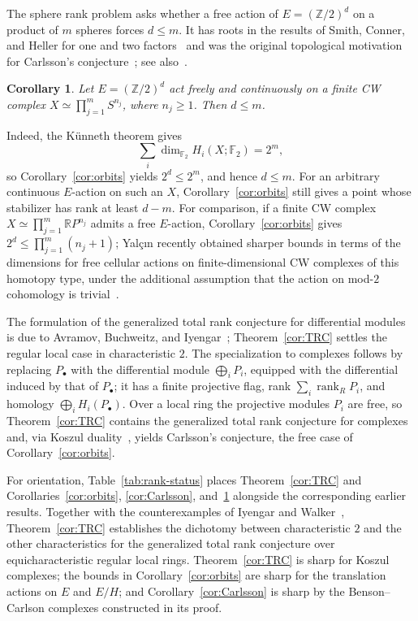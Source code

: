 \documentclass[11pt,reqno]{amsart}
\theoremstyle{plain}
\newtheorem{corintro}[thmintro]{Corollary}
\theoremstyle{definition}
\DeclareMathOperator{\rank}{rank}
\newcommand{\Ff}{\mathbb{F}}
\newcommand{\Z}{\mathbb{Z}}
\begin{document}
The sphere rank problem asks whether a free action of $E=(\Z/2)^d$ on a product of $m$ spheres
forces $d\le m$.  It has roots in the results of Smith, Conner, and Heller for one and two
factors~\cite{Smith,Conner,Heller} and was the original topological motivation for Carlsson's
conjecture~\cite{CarlssonSpheres,CarlssonSphereRank}; see
also~\cite{AdemBrowder,Hanke,OkutanYalcin}.
\begin{corintro}\label{cor:sphere-rank}
Let $E=(\Z/2)^d$ act freely and continuously on a finite CW complex
$X\simeq\prod_{j=1}^m S^{n_j}$, where $n_j\ge1$.  Then $d\le m$.
\end{corintro}

Indeed, the K\"unneth theorem gives
\[
 \sum_i\dim_{\Ff_2}H_i(X;\Ff_2)=2^m,
\]
so Corollary~\ref{cor:orbits} yields $2^d\le2^m$, and hence $d\le m$.  For an arbitrary continuous $E$-action
on such an $X$, Corollary~\ref{cor:orbits} still gives a point whose stabilizer has rank at least
$d-m$.  For comparison, if a finite CW complex
$X\simeq\prod_{j=1}^m\mathbb{R}P^{n_j}$ admits a free $E$-action, Corollary~\ref{cor:orbits} gives
$2^d\le\prod_{j=1}^m(n_j+1)$; Yal\c{c}{\i}n recently obtained sharper bounds in terms of the dimensions for
free cellular actions on finite-dimensional CW complexes of this homotopy type, under the additional
assumption that the action on mod-$2$ cohomology is trivial~\cite[Theorem~2]{YalcinRP}.

The formulation of the generalized total rank conjecture for differential modules is due to
Avramov, Buchweitz, and Iyengar~\cite[Conjecture~5.3]{ABI}; Theorem~\ref{cor:TRC} settles the regular local case in
characteristic $2$.  The specialization to complexes follows by replacing $P_\bullet$ with the
differential module $\bigoplus_iP_i$, equipped with the differential induced by that of $P_\bullet$;
it has a finite projective flag, rank $\sum_i\rank_RP_i$, and homology $\bigoplus_iH_i(P_\bullet)$.  Over a local ring the
projective modules $P_i$ are free, so
Theorem~\ref{cor:TRC} contains the generalized total rank conjecture for complexes and, via Koszul
duality~\cite[Theorem~II.7 and Proposition~II.9]{Carlsson}, yields Carlsson's conjecture, the free case of
Corollary~\ref{cor:orbits}.

\begin{samepage}
For orientation, Table~\ref{tab:rank-status} places Theorem~\ref{cor:TRC} and
Corollaries~\ref{cor:orbits}, \ref{cor:Carlsson}, and~\ref{cor:sphere-rank} alongside the
corresponding earlier results.  Together with the counterexamples of Iyengar and Walker~\cite{IyengarWalker},
Theorem~\ref{cor:TRC} establishes the dichotomy between characteristic $2$ and the other
characteristics for the generalized total rank conjecture over equicharacteristic regular local
rings.  Theorem~\ref{cor:TRC} is sharp for Koszul complexes; the bounds in
Corollary~\ref{cor:orbits} are sharp for the translation actions on $E$ and $E/H$; and
Corollary~\ref{cor:Carlsson} is sharp by the Benson--Carlson complexes constructed in its proof.\par
\end{samepage}
\end{document}
